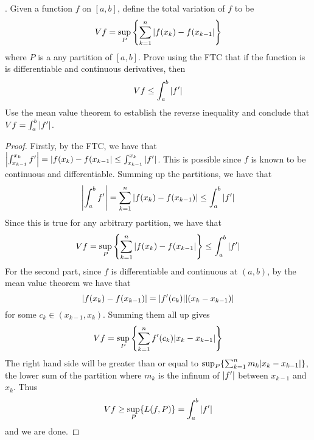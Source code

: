 \documentclass[a4paper]{article}
\begin{document}
\begin{qtn}{}{}
\thetcbcounter.\;\; Given a function $f$ on $[a,b]$, define the total variation of $f$ to be $$Vf=\sup_P\left\{\sum_{k=1}^n\abs{f(x_k)-f(x_{k-1}}\right\}$$ where $P$ is a any partition of $[a,b]$. Prove using the FTC that if the function is is differentiable and continuous derivatives, then $$Vf\leq\int_a^b\abs{f'}$$ Use the mean value theorem to establish the reverse inequality and conclude that $Vf=\int_a^b\abs{f'}$. \\\hspace*{\fill}\cite{R0004}\tcbline
\begin{proof}
Firstly, by the FTC, we have that $\abs{\int_{x_{k-1}}^{x_k}f'}=\abs{f(x_k)-f(x_{k-1}}\leq\int_{x_{k-1}}^{x_k}\abs{f'}$. This is possible since $f$ is known to be continuous and differentiable. Summing up the partitions, we have that $$\abs{\int_a^bf'}=\sum_{k=1}^n\abs{f(x_k)-f(x_{k-1})}\leq\int_a^b\abs{f'}$$ Since this is true for any arbitrary partition, we have that $$Vf=\sup_P\left\{\sum_{k=1}^n\abs{f(x_k)-f(x_{k-1}}\right\}\leq\int_a^b\abs{f'}$$ For the second part, since $f$ is differentiable and continuous at $(a,b)$, by the mean value theorem we have that $$\abs{f(x_k)-f(x_{k-1})}=\abs{f'(c_k)}\abs{(x_k-x_{k-1})}$$ for some $c_k\in(x_{k-1},x_k)$. Summing them all up gives $$Vf=\sup_P\left\{\sum_{k=1}^nf'(c_k)\abs{x_k-x_{k-1}}\right\}$$ The right hand side will be greater than or equal to $\sup_P\{\sum_{k=1}^nm_k\abs{x_k-x_{k-1}}\}$, the lower sum of the partition where $m_k$ is the infinum of $\abs{f'}$ between $x_{k-1}$ and $x_k$. Thus $$Vf\geq\sup_P\{L(f,P)\}=\int_a^b\abs{f'}$$ and we are done. 
\end{proof}
\end{qtn}
\end{document}
